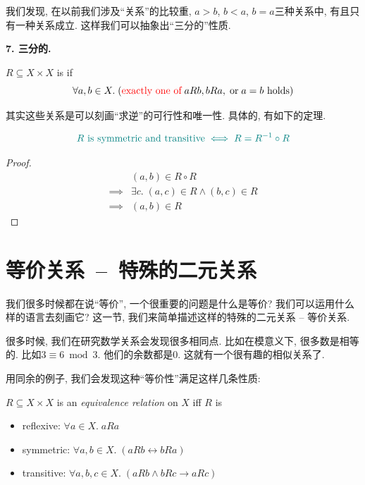 我们发现, 在以前我们涉及``关系''的比较重, $a>b$, $b<a$, $b=a$三种关系中, 有且只有一种关系成立. 这样我们可以抽象出``三分的''性质.  

\textbf{7. 三分的.}

\begin{definition}
  $R \subseteq X \times X$ is  if
  \[
    \forall a, b \in X.\;
      (\text{\textcolor{red}{exactly one of}}\; a R b, b R a, \;\text{or}\; a = b \text{ holds})
  \]
\end{definition}

其实这些关系是可以刻画``求逆''的可行性和唯一性. 具体的, 有如下的定理.

\begin{theorem}
  \[
    \textcolor{teal}{R \text{ is symmetric and transitive} \iff R = R^{-1} \circ R}
  \]
\end{theorem}

\begin{proof}
  \setcounter{equation}{0}
  \begin{align*}
    &(a, b) \in R \circ R \\[6pt]
    \implies& \exists c.\; (a, c) \in R \land (b, c) \in R \\
    \implies& (a, b) \in R
  \end{align*}
\end{proof}

\section{等价关系~--~特殊的二元关系}

我们很多时候都在说``等价'', 一个很重要的问题是什么是等价? 我们可以运用什么样的语言去刻画它? 这一节, 我们来简单描述这样的特殊的二元关系 -- 等价关系.

很多时候, 我们在研究数学关系会发现很多相同点. 比如在模意义下, 很多数是相等的. 比如$3 \equiv 6 \bmod 3$. 他们的余数都是$0$. 这就有一个很有趣的相似关系了. 

用同余的例子, 我们会发现这种``等价性''满足这样几条性质: 

\begin{definition}
  $R \subseteq X \times X$ is an {\it equivalence relation} on $X$ iff $R$ is
  \begin{itemize}
    \item reflexive: $\forall a \in X.\; a R a$
    \item symmetric: $\forall a, b \in X.\; (a R b \leftrightarrow b R a)$
    \item transitive: $\forall a, b, c \in X.\; (a R b \land b R c \to a R c)$
  \end{itemize}
\end{definition}

